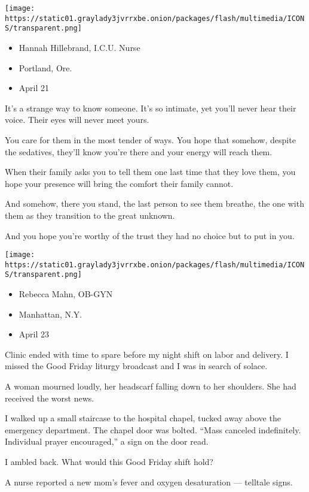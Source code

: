 \texttt{[image: https://static01.graylady3jvrrxbe.onion/packages/flash/multimedia/ICONS/transparent.png]}

\begin{itemize}
\tightlist
\item
  Hannah Hillebrand, I.C.U. Nurse
\item
  Portland, Ore.
\item
  April 21
\end{itemize}

It's a strange way to know someone. It's so intimate, yet you'll never
hear their voice. Their eyes will never meet yours.

You care for them in the most tender of ways. You hope that somehow,
despite the sedatives, they'll know you're there and your energy will
reach them.

When their family asks you to tell them one last time that they love
them, you hope your presence will bring the comfort their family cannot.

And somehow, there you stand, the last person to see them breathe, the
one with them as they transition to the great unknown.

And you hope you're worthy of the trust they had no choice but to put in
you.

\texttt{[image: https://static01.graylady3jvrrxbe.onion/packages/flash/multimedia/ICONS/transparent.png]}

\begin{itemize}
\tightlist
\item
  Rebecca Mahn, OB-GYN
\item
  Manhattan, N.Y.
\item
  April 23
\end{itemize}

Clinic ended with time to spare before my night shift on labor and
delivery. I missed the Good Friday liturgy broadcast and I was in search
of solace.

A woman mourned loudly, her headscarf falling down to her shoulders. She
had received the worst news.

I walked up a small staircase to the hospital chapel, tucked away above
the emergency department. The chapel door was bolted. ``Mass canceled
indefinitely. Individual prayer encouraged,'' a sign on the door read.

I ambled back. What would this Good Friday shift hold?

A nurse reported a new mom's fever and oxygen desaturation --- telltale
signs.

